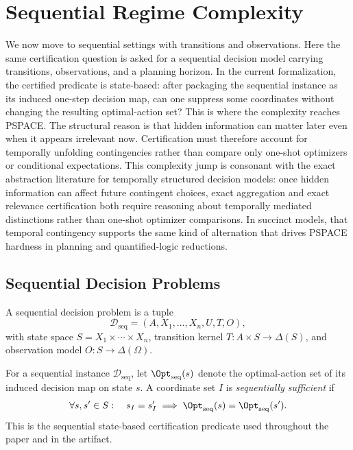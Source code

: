 \section{Sequential Regime Complexity}\label{sec:sequential}

We now move to sequential settings with transitions and observations. Here the same certification question is asked for a sequential decision model carrying transitions, observations, and a planning horizon. In the current formalization, the certified predicate is state-based: after packaging the sequential instance as its induced one-step decision map, can one suppress some coordinates without changing the resulting optimal-action set? This is where the complexity reaches PSPACE. The structural reason is that hidden information can matter later even when it appears irrelevant now. Certification must therefore account for temporally unfolding contingencies rather than compare only one-shot optimizers or conditional expectations. This complexity jump is consonant with the exact abstraction literature for temporally structured decision models: once hidden information can affect future contingent choices, exact aggregation and exact relevance certification both require reasoning about temporally mediated distinctions rather than one-shot optimizer comparisons. In succinct models, that temporal contingency supports the same kind of alternation that drives PSPACE hardness in planning and quantified-logic reductions.

\subsection{Sequential Decision Problems}

\begin{definition}\label{def:sequential-decision-problem}
A sequential decision problem is a tuple
\[
\mathcal{D}_{\mathrm{seq}}=(A,X_1,\ldots,X_n,U,T,O),
\]
with state space $S=X_1\times\cdots\times X_n$, transition kernel $T:A\times S\to\Delta(S)$, and observation model $O:S\to\Delta(\Omega)$.
\end{definition}

\begin{definition}\label{def:sequential-sufficient}
For a sequential instance $\mathcal D_{\mathrm{seq}}$, let $\Opt_{\mathrm{seq}}(s)$ denote the optimal-action set of its induced decision map on state $s$. A coordinate set $I$ is \emph{sequentially sufficient} if
\[
\forall s,s'\in S:\quad s_I=s'_I \implies \Opt_{\mathrm{seq}}(s)=\Opt_{\mathrm{seq}}(s').
\]
This is the sequential state-based certification predicate used throughout the paper and in the artifact.
\end{definition}

